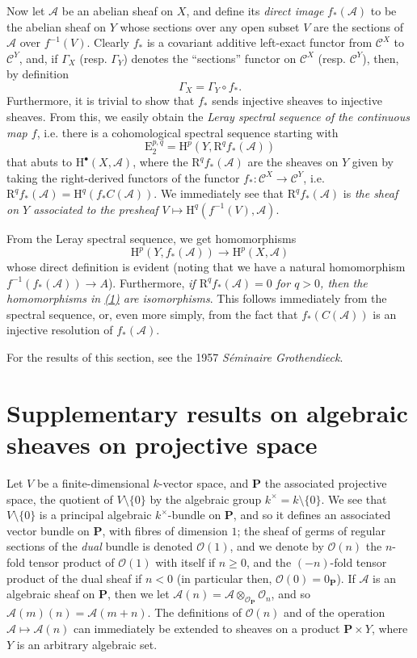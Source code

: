 \documentclass{article}
\newcommand{\scr}[1]{{\mathscr{#1}}}
\renewcommand{\cal}[1]{{\mathcal{#1}}}
\newcommand{\HH}{\mathrm{H}}
\newcommand{\EE}{\mathrm{E}}
\newcommand{\RR}{\mathrm{R}}
\renewcommand{\geq}{\geqslant}
\newcommand{\oldpage}[1]{\marginpar{\footnotesize$\Big\vert$ \textit{p.~#1}}}
\begin{document}
Now let $\scr{A}$ be an abelian sheaf on $X$, and define its \emph{direct image} $f_*(\scr{A})$ to be the abelian sheaf on $Y$ whose sections over any open subset $V$ are the sections of $\scr{A}$ over $f^{-1}(V)$.
Clearly $f_*$ is a covariant additive left-exact functor from $\cal{C}^X$ to $\cal{C}^Y$, and, if $\Gamma_X$ (resp. $\Gamma_Y$) denotes the ``sections'' functor on $\cal{C}^X$ (resp. $\cal{C}^Y$), then, by definition
\[
  \Gamma_X = \Gamma_Y\circ f_*.
\]
Furthermore, it is trivial to show that $f_*$ sends injective sheaves to injective sheaves.
From this, we easily obtain the \emph{Leray spectral sequence of the continuous map $f$}, i.e. there is a cohomological spectral sequence starting with
\[
  \EE_2^{p,q} = \HH^p(Y,\RR^qf_*(\scr{A}))
\]
that abuts to $\HH^\bullet(X,\scr{A})$, where the $\RR^qf_*(\scr{A})$ are the sheaves on $Y$ given by taking the right-derived functors of the functor $f_*\colon\cal{C}^X\to\cal{C}^Y$, i.e. $\RR^qf_*(\scr{A}) = \HH^q(f_*C(\scr{A}))$.
We immediately see that $\RR^qf_*(\scr{A})$ is \emph{the sheaf on $Y$ associated to the presheaf $V\mapsto\HH^q(f^{-1}(V),\scr{A})$}.

From the Leray spectral sequence, we get homomorphisms
\[
\label{equation1}
  \HH^p(Y,f_*(\scr{A})) \to \HH^p(X,\scr{A})
  \tag{1}
\]
whose direct definition is evident (noting that we have a natural homomorphism $f^{-1}(f_*(\scr{A}))\to A$).
Furthermore, \emph{if $\RR^qf_*(\scr{A})=0$ for $q>0$, then the}
\oldpage{2-06}
\emph{homomorphisms in \hyperref[equation1]{(1)} are isomorphisms}.
This follows immediately from the spectral sequence, or, even more simply, from the fact that $f_*(C(\scr{A}))$ is an injective resolution of $f_*(\scr{A})$.

For the results of this section, see the 1957 \emph{S\'{e}minaire Grothendieck}.


\section{Supplementary results on algebraic sheaves on projective space}
\label{section4}

Let $V$ be a finite-dimensional $k$-vector space, and $\mathbf{P}$ the associated projective space, the quotient of $V\setminus\{0\}$ by the algebraic group $k^\times=k\setminus\{0\}$.
We see that $V\setminus\{0\}$ is a principal algebraic $k^\times$-bundle on $\mathbf{P}$, and so it defines an associated vector bundle on $\mathbf{P}$, with fibres of dimension $1$;
the sheaf of germs of regular sections of the \emph{dual} bundle is denoted $\scr{O}(1)$, and we denote by $\scr{O}(n)$ the $n$-fold tensor product of $\scr{O}(1)$ with itself if $n\geq0$, and the $(-n)$-fold tensor product of the dual sheaf if $n<0$ (in particular then, $\scr{O}(0)=\scr{0}_\mathbf{P}$).
If $\scr{A}$ is an algebraic sheaf on $\mathbf{P}$, then we let $\scr{A}(n)=\scr{A}\otimes_{\scr{O}_\mathbf{P}}\scr{O}_n$, and so $\scr{A}(m)(n)=\scr{A}(m+n)$.
The definitions of $\scr{O}(n)$ and of the operation $\scr{A}\mapsto\scr{A}(n)$ can immediately be extended to sheaves on a product $\mathbf{P}\times Y$, where $Y$ is an arbitrary algebraic set.
\end{document}
